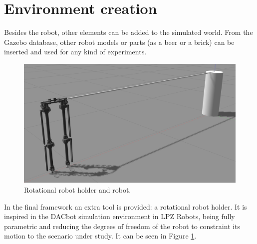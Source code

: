\section{Environment creation} %
\label{sec:environment_creation}
Besides the robot, other elements can be added to the simulated world.
From the Gazebo database, other robot models or parts (as a beer or a brick) can be inserted and used for any kind of experiments.

\begin{figure}[hb!]
  \centering
  \includegraphics[width=0.75\linewidth]{figures/gazebo_rotational_holder}
  \caption{Rotational robot holder and robot.}
  \label{fig:rotational_robot_holder}
\end{figure}

\hfill

In the final framework an extra tool is provided: a rotational robot holder.
It is inspired in the DACbot simulation environment in LPZ Robots, being fully parametric and reducing the degrees of freedom of the robot to constraint its motion to the scenario under study.
It can be seen in Figure \ref{fig:rotational_robot_holder}.

